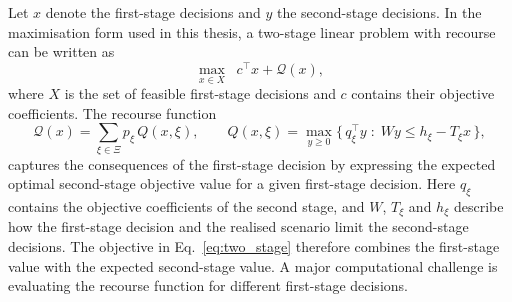 Let $x$ denote the first-stage decisions and $y$ the second-stage decisions. In the maximisation form used in this thesis, a two-stage linear problem with recourse can be written as
\begin{equation}
\max_{x\in X}\;\; c^{\top}x+\mathcal{Q}(x),
\label{eq:two_stage}
\end{equation}
where $X$ is the set of feasible first-stage decisions and $c$ contains their objective coefficients. The recourse function
\begin{equation}
\mathcal{Q}(x)=\sum_{\xi\in\Xi}p_\xi\,Q(x,\xi),
\qquad
Q(x,\xi)=\max_{y\ge 0}\bigl\{\,q_\xi^{\top}y \;:\; W y\le h_\xi-T_\xi x\,\bigr\},
\label{eq:recourse}
\end{equation}
captures the consequences of the first-stage decision by expressing the expected optimal
second-stage objective value for a given first-stage decision. Here $q_\xi$ contains the objective coefficients of the second stage, and $W$, $T_\xi$ and $h_\xi$ describe how the first-stage decision and the realised scenario limit the second-stage decisions.
The objective in Eq.~\eqref{eq:two_stage} therefore combines the first-stage value
with the expected second-stage value. A major
computational challenge is evaluating the recourse
function for different first-stage decisions.

